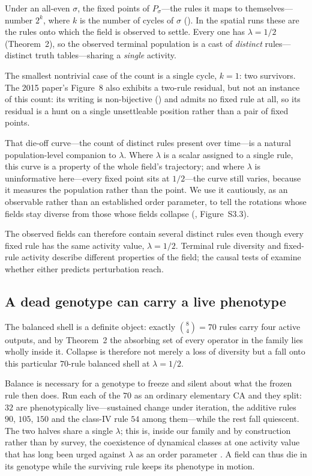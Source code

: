 \documentclass[man,12pt,floatsintext,donotrepeattitle]{apa7}
\newcommand{\sig}{\sigma}
\newcommand{\secref}[1]{\emph{\nameref{#1}}}
\begin{document}
Under an all-even $\sig$, the fixed points of $P_\sig$---the rules it maps to themselves---number $2^k$, where $k$ is the number of cycles of $\sig$ (\secref{sec:classification}). In the spatial runs these are
the rules onto which the field is observed to settle. Every one has
$\lambda = 1/2$ (Theorem~2), so the observed terminal
population is a cast of \emph{distinct} rules---distinct truth tables---sharing
a \emph{single} activity.

The smallest nontrivial case of the count is a single cycle, $k = 1$: two
survivors. The 2015 paper's Figure~8 also exhibits a two-rule residual, but not
an instance of this count: its writing is non-bijective (\secref{sec:object})
and admits no fixed rule at all, so its residual is a hunt on a single
unsettleable position rather than a pair of fixed points.

That die-off curve---the count of distinct rules present over time---is a
natural population-level companion to $\lambda$. Where $\lambda$ is a scalar
assigned to a single rule, this curve is a property of the whole field's
trajectory; and where $\lambda$ is uninformative here---every fixed point
sits at $1/2$---the curve still varies, because it measures the population
rather than the point. We use it cautiously, as an observable rather than an
established order parameter, to tell the rotations whose fields stay diverse
from those whose fields collapse (\secref{sec:interrupter},
Figure~S3.3).

The observed fields can therefore contain several distinct rules even though every fixed rule has the same activity value, $\lambda=1/2$. Terminal rule diversity and fixed-rule activity describe different properties of the field; the causal tests of \secref{sec:causal} examine whether either predicts perturbation reach.


\subsection{A dead genotype can carry a live phenotype}
\label{sec:shell}

The balanced shell is a definite object: exactly $\binom{8}{4} = 70$ rules
carry four active outputs, and by Theorem~2 the absorbing set of
every operator in the family lies wholly inside it. Collapse is therefore not
merely a loss of diversity but a fall onto this particular $70$-rule balanced
shell at $\lambda = 1/2$.

Balance is necessary for a genotype to freeze and silent about what the frozen
rule then does. Run each of the $70$ as an ordinary elementary CA and they
split: $32$ are phenotypically live---sustained change under iteration, the
additive rules $90$, $105$, $150$ and the class-IV rule $54$ among them---while
the rest fall quiescent. The two halves share a single $\lambda$; this is,
inside our family and by construction rather than by survey, the coexistence of
dynamical classes at one activity value that has long been urged against
$\lambda$ as an order parameter \parencite{sakai2002edge}. A field can thus die
in its genotype while the surviving rule keeps its phenotype in motion.
\end{document}
